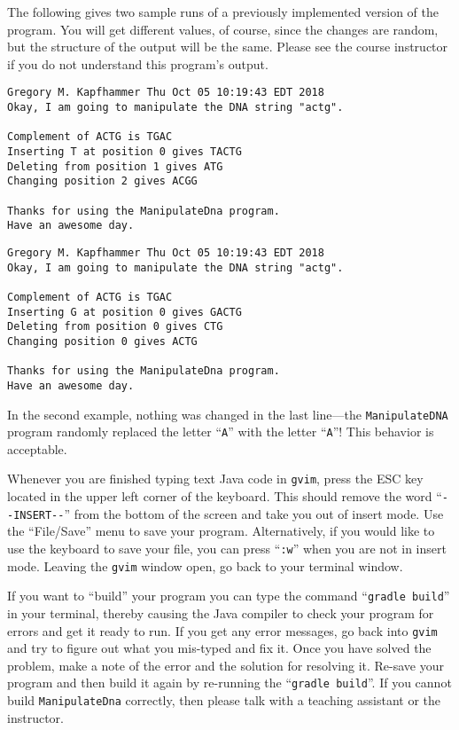 \documentclass[11pt]{article}
\newcommand{\mainprogram}{\lstinline{ManipulateDna}}
\newcommand{\gradlebuild}{\command{gradle build}}
\newcommand{\command}[1]{``\lstinline{#1}''}
\newcommand{\program}[1]{\lstinline{#1}}
\newcommand{\option}[1]{``{#1}''}
\newcommand{\step}[1]{``{#1}''}
\begin{document}
The following gives two sample runs of a previously implemented version of the program. You will get different values,
of course, since the changes are random, but the structure of the output will be the same. Please see the course
instructor if you do not understand this program's output.

\begin{verbatim}
Gregory M. Kapfhammer Thu Oct 05 10:19:43 EDT 2018
Okay, I am going to manipulate the DNA string "actg".

Complement of ACTG is TGAC
Inserting T at position 0 gives TACTG
Deleting from position 1 gives ATG
Changing position 2 gives ACGG

Thanks for using the ManipulateDna program.
Have an awesome day.
\end{verbatim}

\begin{verbatim}
Gregory M. Kapfhammer Thu Oct 05 10:19:43 EDT 2018
Okay, I am going to manipulate the DNA string "actg".

Complement of ACTG is TGAC
Inserting G at position 0 gives GACTG
Deleting from position 0 gives CTG
Changing position 0 gives ACTG

Thanks for using the ManipulateDna program.
Have an awesome day.
\end{verbatim}

In the second example, nothing was changed in the last line---the {\tt ManipulateDNA} program randomly replaced the
letter ``{\tt A}'' with the letter ``{\tt A}''! This behavior is acceptable.

Whenever you are finished typing text Java code in \program{gvim}, press the ESC key located in the upper left corner of
the keyboard. This should remove the word \command{--INSERT--} from the bottom of the screen and take you out of insert
mode. Use the \option{File/Save} menu to save your program. Alternatively, if you would like to use the keyboard to save
your file, you can press \command{:w} when you are not in insert mode. Leaving the {\tt gvim} window open, go back to
your terminal window.

If you want to \step{build} your program you can type the command \gradlebuild{} in your terminal, thereby causing the
Java compiler to check your program for errors and get it ready to run. If you get any error messages, go back into
\program{gvim} and try to figure out what you mis-typed and fix it. Once you have solved the problem, make a note of the
error and the solution for resolving it. Re-save your program and then build it again by re-running the \gradlebuild{}.
If you cannot build \mainprogram{} correctly, then please talk with a teaching assistant or the instructor.
\end{document}
